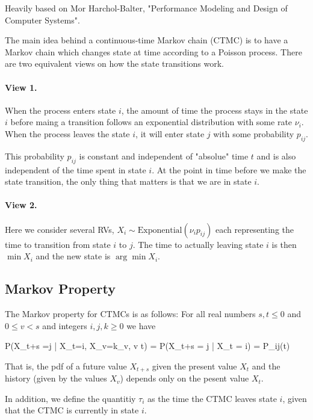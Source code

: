 
Heavily based on Mor Harchol-Balter, "Performance Modeling and Design of Computer Systems".

The main idea behind a continuous-time Markov chain (CTMC) is to have a Markov chain which changes state at time according to a Poisson process. There are two equivalent views on how the state transitions work.

\paragraph{View 1.} When the process enters state $i$, the amount of time the process stays in the state $i$ before maing a transition follows an exponential distribution with some rate $\nu_i$. When the process leaves the state $i$, it will enter state $j$ with some probability $p_{ij}$.

This probability $p_{ij}$ is constant and independent of "absolue" time $t$ and is also independent of the time spent in state $i$. At the point in time before we make the state transition, the only thing that matters is that we are in state $i$. 

\paragraph{View 2.} Here we consider several RVs, $X_i \sim \text{Exponential}(\nu_i p_{ij})$ each representing the time to transition from state $i$ to $j$. The time to actually leaving state $i$ is then $\min X_i$ and the new state is $\arg \min X_i$.



\subsection{Markov Property}

The Markov property for CTMCs is as follows: For all real numbers $s,t \leq 0$ and $0 \leq v < s$ and integers $i,j,k \geq 0$ we have

\bee
P(X_{t+s} =j | X_t=i, X_v=k_v, v \leq t) = P(X_{t+s} = j | X_t = i) = P_{ij}(t)
\eee

That is, the pdf of a future value $X_{t+s}$ given the present value $X_t$ and the history (given by the values $X_v$) depends only on the pesent value $X_t$.

In addition, we define the quantitiy $\tau_i$ as the time the CTMC leaves state $i$, given that the CTMC is currently in state $i$.





